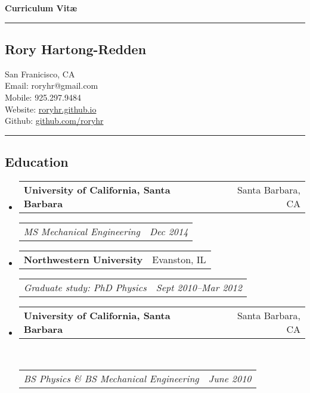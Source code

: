 \documentclass[10pt,letterpaper]{article}
\makeatletter
\newenvironment{indentsection}[1]%
{\begin{list}{}%
	{\setlength{\leftmargin}{#1}}%
	\item[]%
}
{\end{list}}
\newcommand{\headerrow}[2]
{\begin{tabular*}{\linewidth}{l@{\extracolsep{\fill}}r}
	#1 &
	#2 \\
\end{tabular*}}
\makeatother
\begin{document}
{\raggedright \LARGE \bf Curriculum Vit\ae}
\newline
\hrule
\subsection*{Rory Hartong-Redden}
\begin{indentsection}{\parindent}
San Franicisco, CA   \\
Email: roryhr@gmail.com \\
Mobile: 925.297.9484 \\
Website: \href{roryhr.github.io}{roryhr.github.io} \\
Github: \href{https://github.com/roryhr}{github.com/roryhr}
\end{indentsection}

\hrule
\subsection*{Education}
\begin{itemize}
	\parskip=-0.1em
	\item 
	\headerrow
		{\textbf{University of California, Santa Barbara}}
		{Santa Barbara, CA}
	\headerrow
		{\emph{MS  Mechanical Engineering}}
		{\emph{Dec 2014}}
	\item 
	\headerrow
		{\textbf{Northwestern University}}
		{Evanston, IL}
	\headerrow
		{\emph{Graduate study: PhD Physics}}
		{\emph{Sept 2010--Mar 2012}}
	\item 
	\headerrow
		{\textbf{University of California, Santa Barbara}}
		{Santa Barbara, CA}	\\
	\headerrow
		{\emph{BS Physics \&  BS Mechanical Engineering}}
		{\emph{June 2010}}
\end{itemize}
\end{document}
